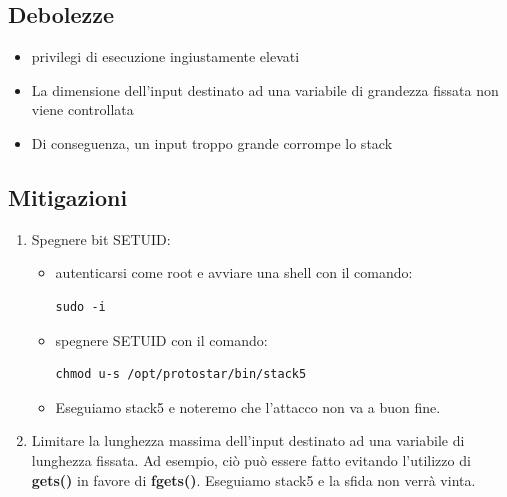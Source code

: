 \subsection{Debolezze}
\begin{itemize}
    \item privilegi di esecuzione ingiustamente elevati
    \item La dimensione dell'input destinato ad una variabile di grandezza fissata non viene controllata
    \item Di conseguenza, un input troppo grande corrompe lo stack
\end{itemize}

\subsection{Mitigazioni}
\begin{enumerate}
    \item Spegnere bit SETUID:
    \begin{itemize}
        \item autenticarsi come root e avviare una shell con il comando: \begin{lstlisting}[style=bashstyle] 
        sudo -i
        \end{lstlisting}
        \item spegnere SETUID con il comando: \begin{lstlisting}[style=bashstyle] 
        chmod u-s /opt/protostar/bin/stack5
        \end{lstlisting}   
        \item Eseguiamo stack5 e noteremo che l'attacco non va a buon fine. 
    \end{itemize}
    \item Limitare la lunghezza massima dell'input destinato ad una variabile di lunghezza fissata. Ad esempio, ciò può essere fatto evitando l’utilizzo di \textbf{gets()} in favore di \textbf{fgets()}.
    Eseguiamo stack5 e la sfida non verrà vinta.
\end{enumerate}
